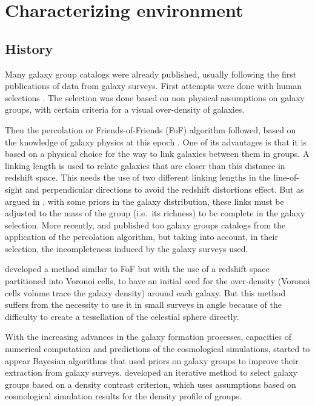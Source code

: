 \section{Characterizing environment}
\label{sec:characterizing_environment}

\subsection{History}
\label{sub:history}

Many galaxy group catalogs were already published, usually following the first
publications of data from galaxy surveys. First attempts were done with human
selections \citep{Abell+58,Zwicky+61,Rose+76}. The selection was done based on
non physical assumptions on galaxy groups, with certain criteria for a visual
over-density of galaxies.

Then the percolation or Friends-of-Friends (FoF) algorithm followed, based on
the knowledge of galaxy physics at this epoch \citep{Huchra+82,Nolthenius+87}.
One of its advantages is that it is based on a physical choice for the way to
link galaxies between them in groups. A linking length is used to relate
galaxies that are closer than this distance in redshift space. This needs the
use of two different linking lengths in the line-of-sight and perpendicular
directions to avoid the redshift distortions effect. But as argued in
\citet{DM+14a}, with some priors in the galaxy distribution, these links must
be adjusted to the mass of the group (i.e.\ its richness) to be complete in the
galaxy selection. More recently, \citet{Eke+04} and \citet{Berlind+06}
published too galaxy groups catalogs from the application of the percolation
algorithm, but taking into account, in their selection, the incompleteness
induced by the galaxy surveys used.

\citet{Marinoni+02} developed a method similar to FoF but with the use of a
redshift space partitioned into Voronoi cells, to have an initial seed for the
over-density (Voronoi cells volume trace the galaxy density) around each
galaxy. But this method suffers from the necessity to use it in small surveys
in angle because of the difficulty to create a tessellation of the celestial
sphere directly.

With the increasing advances in the galaxy formation processes, capacities of
numerical computation and predictions of the cosmological simulations, started
to appear Bayesian algorithms that used priors on galaxy groups to improve
their extraction from galaxy surveys. \citet{Yang+05,Yang+07} developed an
iterative method to select galaxy groups based on a density contrast criterion,
which uses assumptions based on cosmological simulation results for the density
profile of groups.

